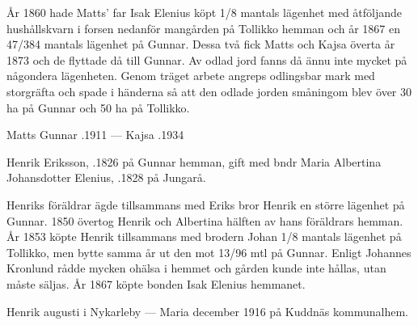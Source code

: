 År 1860 hade Matts' far Isak Elenius köpt 1/8 mantals lägenhet med åtföljande hushållskvarn i forsen nedanför mangården på Tollikko hemman och år 1867 en 47/384 mantals lägenhet på Gunnar. Dessa två fick Matts och Kajsa överta år 1873 och de flyttade då till Gunnar. Av odlad jord fanns då ännu inte mycket på någondera lägenheten. Genom träget arbete angreps odlingsbar mark med storgräfta och spade i händerna så att den odlade jorden småningom blev över 30 ha på Gunnar och 50 ha på Tollikko.

Matts Gunnar .1911  ---  Kajsa .1934


Henrik Eriksson, .1826 på Gunnar hemman, gift med bndr Maria Albertina Johansdotter Elenius, .1828 på Jungarå.
\begin{jhchildren}
  \item {}
  \item {}
  \item {}
  \item {}
  \item {}
  \item {}
  \item {}
  \item {}
  \item {}
  \item {}
\end{jhchildren}

Henriks föräldrar ägde tillsammans med Eriks bror Henrik en större lägenhet på Gunnar. 1850 övertog Henrik och Albertina hälften av hans föräldrars hemman. År 1853 köpte Henrik tillsammans med brodern Johan 1/8 mantals lägenhet på Tollikko, men bytte samma år ut den mot 13/96 mtl på Gunnar. Enligt Johannes Kronlund rådde mycken ohälsa i hemmet och gården kunde inte hållas, utan måste säljas. År 1867 köpte bonden Isak Elenius hemmanet.

Henrik  augusti i Nykarleby  ---  Maria  december 1916 på Kuddnäs kommunalhem.






